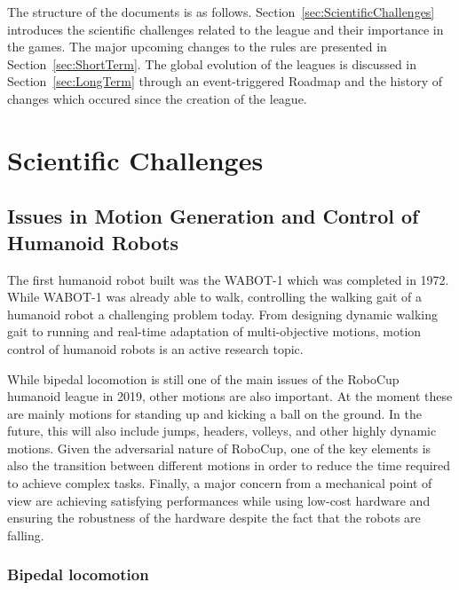 \documentclass{article}
\begin{document}
The structure of the documents is as
follows. Section~\ref{sec:ScientificChallenges} introduces the scientific
challenges related to the league and their importance in the games. The major
upcoming changes to the rules are presented in Section~\ref{sec:ShortTerm}. The
global evolution of the leagues is discussed in Section~\ref{sec:LongTerm}
through an event-triggered Roadmap and the history of changes which occured
since the creation of the league.

\section{\label{sec:ScientificChallenges}Scientific Challenges}


\subsection{Issues in Motion Generation and Control of Humanoid Robots}

The first humanoid robot built was the WABOT-1 which was completed in 1972. 
While WABOT-1 was already able to walk, controlling the walking gait of a humanoid robot a challenging problem today. 
From designing dynamic walking gait to running and real-time adaptation of multi-objective motions, motion control of humanoid robots is an active research topic.

While bipedal locomotion is still one of the main issues of the RoboCup humanoid
league in 2019, other motions are also important. 
At the moment these are mainly motions for standing up and kicking a ball on the ground.
In the future, this will also include jumps, headers, volleys, and other highly dynamic motions.
Given the adversarial nature of RoboCup, one of the key elements is also the transition between different motions in order to reduce the time required to achieve complex tasks. 
Finally, a major concern from a mechanical point of view are achieving satisfying performances while using low-cost hardware and ensuring the robustness of the hardware despite the fact that the robots are falling.

\subsubsection{Bipedal locomotion}

\end{document}
